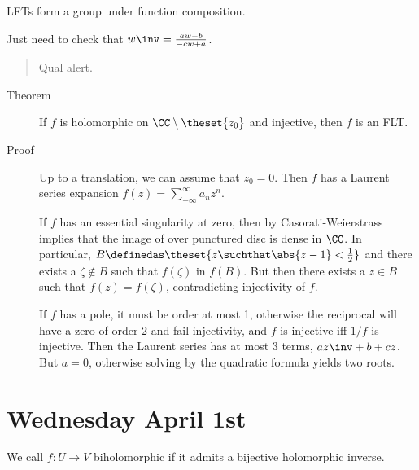 \begin{description}
\tightlist
\item[Proposition]
LFTs form a group under function composition.
\item[Proof]
Just need to check that \(w\inv = {aw - b \over -cw + a}\).
\end{description}

\begin{quote}
Qual alert.
\end{quote}

\begin{description}
\item[Theorem]
If \(f\) is holomorphic on \(\CC \setminus \theset{z_0}\) and injective,
then \(f\) is an FLT.
\item[Proof]
Up to a translation, we can assume that \(z_0 = 0\). Then \(f\) has a
Laurent series expansion \(f(z) = \sum_{-\infty}^\infty a_n z^n\).

If \(f\) has an essential singularity at zero, then by
Casorati-Weierstrass implies that the image of over punctured disc is
dense in \(\CC\). In particular,
\(B \definedas \theset{z \suchthat \abs{z-1} < {1 \over 2}}\) and there
exists a \(\zeta \not\in B\) such that \(f(\zeta)\) in \(f(B)\). But
then there exists a \(z\in B\) such that \(f(z) = f(\zeta)\),
contradicting injectivity of \(f\).

If \(f\) has a pole, it must be order at most 1, otherwise the
reciprocal will have a zero of order 2 and fail injectivity, and \(f\)
is injective iff \(1/f\) is injective. Then the Laurent series has at
most 3 terms, \(az\inv + b + cz\). But \(a=0\), otherwise solving by the
quadratic formula yields two roots.
\end{description}

\hypertarget{wednesday-april-1st}{%
\section{Wednesday April 1st}\label{wednesday-april-1st}}

We call \(f: U\to V\) biholomorphic if it admits a bijective holomorphic
inverse.

